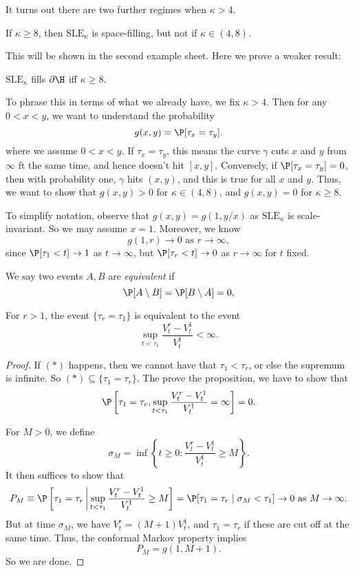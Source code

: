 \documentclass[a4paper]{article}
\newcommand\SLE{\mathrm{SLE}}
\begin{document}
It turns out there are two further regimes when $\kappa > 4$.
\begin{thm}
  If $\kappa \geq 8$, then $\SLE_\kappa$ is space-filling, but not if $\kappa \in (4, 8)$.\fakeqed
\end{thm}
This will be shown in the second example sheet. Here we prove a weaker result:

\begin{prop}
  $\SLE_\kappa$ fills $\partial \H$ iff $\kappa \geq 8$.
\end{prop}

To phrase this in terms of what we already have, we fix $\kappa > 4$. Then for any $0 < x < y$, we want to understand the probability
\[
  g(x, y) = \P[\tau_x = \tau_y].
\]
where we assume $0 < x < y$. If $\tau_x = \tau_y$, this means the curve $\gamma$ cuts $x$ and $y$ from $\infty$ ft the same time, and hence doesn't hit $[x, y]$. Conversely, if $\P[\tau_x = \tau_y] = 0$, then with probability one, $\gamma$ hits $(x, y)$, and this is true for all $x$ and $y$. Thus, we want to show that $g(x, y) > 0$ for $\kappa \in (4, 8)$, and $g(x, y) = 0$ for $\kappa \geq 8$.

To simplify notation, observe that $g(x, y) = g(1, y/x)$ as $\SLE_\kappa$ is scale-invariant. So we may assume $x = 1$. Moreover, we know
\[
  g(1, r) \to 0\text{ as }r \to \infty,
\]
since $\P[\tau_1 < t] \to 1$ as $t \to \infty$, but $\P[\tau_r < t] \to 0$ as $r \to \infty$ for $t$ fixed.

\begin{defi}
  We say two events $A, B$ are \emph{equivalent} if
  \[
    \P[A \setminus B] = \P[B \setminus A] = 0,
  \]
\end{defi}

\begin{prop}
  For $r > 1$, the event $\{\tau_r = \tau_1\}$ is equivalent to the event
  \[
    \sup_{t < \tau_1} \frac{V_t^r - V_t^1}{V_t^1} < \infty.\tag{$*$}
  \]
\end{prop}

\begin{proof}
  If $(*)$ happens, then we cannot have that $\tau_1 < \tau_r$, or else the supremum is infinite. So $(*) \subseteq \{\tau_1 = \tau_r\}$. The prove the proposition, we have to show that
  \[
    \P\left[\tau_1 = \tau_r, \sup_{t < \tau_1} \frac{V_t^r - V_t^1}{V_t^1} = \infty\right] = 0.
  \]

  For $M > 0$, we define
   \[
    \sigma_M = \inf \left\{t \geq 0: \frac{V_t^r - V_t^1}{V_t^1} \geq M\right\}.
  \]
  It then suffices to show that
  \[
    P_M \equiv \P\left[\tau_1 = \tau_r \,\middle|\, \sup_{t < \tau_1} \frac{V_t^r - V_t^1}{V_t^1} \geq M\right] = \P[\tau_1 = \tau_r \mid \sigma_M < \tau_1] \to 0\text{ as }M \to \infty.
  \]
  But at time $\sigma_M$, we have $V_t^r = (M + 1) V_t^1$, and $\tau_1 = \tau_r$ if these are cut off at the same time. Thus, the conformal Markov property implies
  \[
    P_M = g(1, M + 1).
  \]
  So we are done.
\end{proof}
\end{document}
